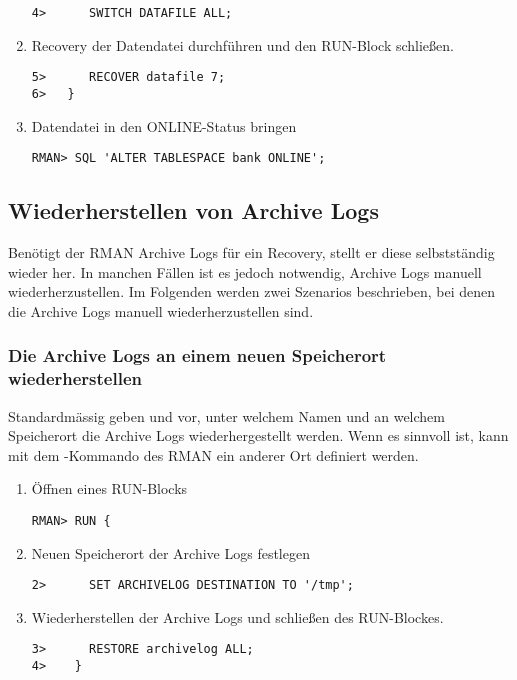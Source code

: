 \begin{enumerate}
            \begin{lstlisting}[caption={Auf den neuen Speicherort umschalten},label=admin1484,language=rman]
4>      SWITCH DATAFILE ALL;
            \end{lstlisting}
            \item Recovery der Datendatei durchführen und den RUN-Block schließen.
            \begin{lstlisting}[caption={Recovery durchführen},label=admin1485,language=rman]
5>      RECOVER datafile 7;
6>   }
            \end{lstlisting}
            \item Datendatei in den ONLINE-Status bringen
            \begin{lstlisting}[caption={Datendatei in den ONLINE-Status bringen},label=admin1486,language=rman,emph={[9]ALTER,TABLESPACE,ONLINE},emphstyle={[9]\color{magenta}\bfseries}]
RMAN> SQL 'ALTER TABLESPACE bank ONLINE';
            \end{lstlisting}
          \end{enumerate}
      \subsection{Wiederherstellen von Archive Logs}
        Benötigt der RMAN Archive Logs für ein Recovery, stellt er diese selbstständig wieder her. In manchen Fällen ist es jedoch notwendig, Archive Logs manuell wiederherzustellen. Im Folgenden werden zwei Szenarios beschrieben, bei denen die Archive Logs manuell wiederherzustellen sind.
        \subsubsection{Die Archive Logs an einem neuen Speicherort wiederherstellen}
          Standardmässig geben  und  vor, unter welchem Namen und an welchem Speicherort die Archive Logs wiederhergestellt werden. Wenn es sinnvoll ist, kann mit dem -Kommando des RMAN ein anderer Ort definiert werden.
          \begin{enumerate}
            \item Öffnen eines RUN-Blocks
              \begin{lstlisting}[caption={Einen RUN-Block öffnen},label=admin1488,language=rman]
RMAN> RUN {
              \end{lstlisting}
            \item Neuen Speicherort der Archive Logs festlegen
              \begin{lstlisting}[caption={Neuen Speicherort festlegen},label=admin1489,language=rman]
2>      SET ARCHIVELOG DESTINATION TO '/tmp';
              \end{lstlisting}
            \item Wiederherstellen der Archive Logs und schließen des RUN-Blockes.
              \begin{lstlisting}[caption={Wiederherstellen der Archive Logs},label=admin1490,language=rman]
3>      RESTORE archivelog ALL;
4>    }
              \end{lstlisting}
          \end{enumerate}
